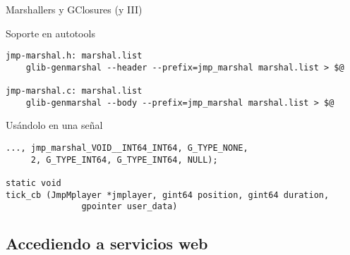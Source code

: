 \documentclass{beamer}
\begin{document}
\begin{frame}[fragile]{Marshallers y GClosures (y III)}

\begin{block}{Soporte en autotools}
\scriptsize{
\begin{verbatim}
jmp-marshal.h: marshal.list
	glib-genmarshal --header --prefix=jmp_marshal marshal.list > $@

jmp-marshal.c: marshal.list
	glib-genmarshal --body --prefix=jmp_marshal marshal.list > $@
\end{verbatim}
}
\end{block}

\begin{block}{Usándolo en una señal}
\scriptsize{
\begin{verbatim}
..., jmp_marshal_VOID__INT64_INT64, G_TYPE_NONE, 
     2, G_TYPE_INT64, G_TYPE_INT64, NULL);
     
static void
tick_cb (JmpMplayer *jmplayer, gint64 position, gint64 duration,
               gpointer user_data)
\end{verbatim}
}
\end{block}
\end{frame}

\subsection{Accediendo a servicios web}
\end{document}
